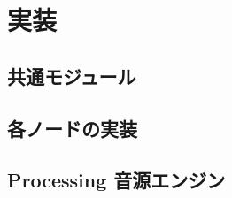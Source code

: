 \chapter{実装}
\label{ch:implementation}

\section{共通モジュール}

\section{各ノードの実装}

\section{Processing 音源エンジン}
